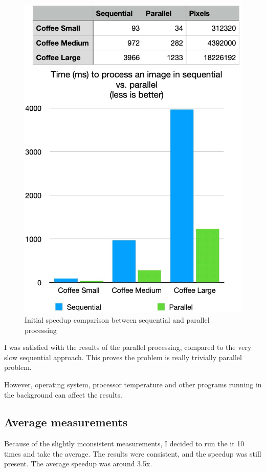 \documentclass{article}
\begin{document}
\begin{multicols}{2}
    \begin{figure}[H]
        \centering
        \includegraphics[width=\linewidth]{img/parallel_speedup.jpg}
        \caption{Initial speedup comparison between sequential and parallel processing}
        \label{fig:speedup}
    \end{figure}

    I was satisfied with the results of the parallel processing, compared to the very slow sequential approach. This proves the problem is really trivially parallel problem.

    However, operating system, processor temperature and other programs running in the background can affect the results.

    \vfill

    \pagebreak

    \subsection{Average measurements}
    Because of the slightly inconsistent measurements, I decided to run the it 10 times and take the average. The results were consistent, and the speedup was still present. The average speedup was around 3.5x.


\end{multicols}
\end{document}
